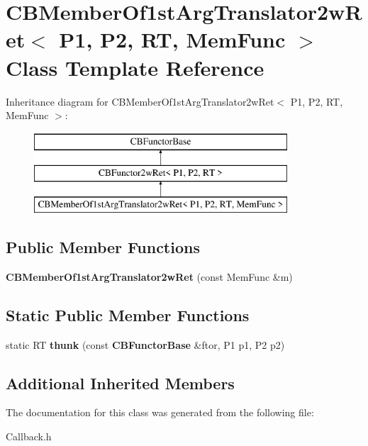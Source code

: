 \section{C\+B\+Member\+Of1st\+Arg\+Translator2w\+Ret$<$ P1, P2, RT, Mem\+Func $>$ Class Template Reference}
\label{classCBMemberOf1stArgTranslator2wRet}
Inheritance diagram for C\+B\+Member\+Of1st\+Arg\+Translator2w\+Ret$<$ P1, P2, RT, Mem\+Func $>$\+:\begin{figure}[H]
\begin{center}
\leavevmode
\includegraphics[height=3.000000cm]{classCBMemberOf1stArgTranslator2wRet}
\end{center}
\end{figure}
\subsection*{Public Member Functions}
\begin{DoxyCompactItemize}
\item 
{\bfseries C\+B\+Member\+Of1st\+Arg\+Translator2w\+Ret} (const Mem\+Func \&m)\label{classCBMemberOf1stArgTranslator2wRet_a044a1350fb9f59ba8ec38ea59305ed8f}

\end{DoxyCompactItemize}
\subsection*{Static Public Member Functions}
\begin{DoxyCompactItemize}
\item 
static RT {\bfseries thunk} (const {\bf C\+B\+Functor\+Base} \&ftor, P1 p1, P2 p2)\label{classCBMemberOf1stArgTranslator2wRet_a441af3982061f212f00b6f2d91cb10d4}

\end{DoxyCompactItemize}
\subsection*{Additional Inherited Members}


The documentation for this class was generated from the following file\+:\begin{DoxyCompactItemize}
\item 
Callback.\+h\end{DoxyCompactItemize}
